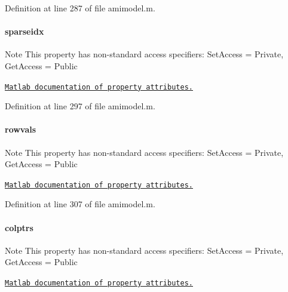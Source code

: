 Definition at line 287 of file amimodel.\+m.

\hypertarget{classamimodel_a6ffb112eda9ff756e17104210981b30b}{}
\paragraph[{sparseidx}]{\setlength{\rightskip}{0pt plus 5cm}sparseidx}\label{classamimodel_a6ffb112eda9ff756e17104210981b30b}
\begin{DoxyNote}{Note}
This property has non-\/standard access specifiers\+: {\ttfamily Set\+Access = Private, Get\+Access = Public} 

\href{http://www.mathworks.com/help/matlab/matlab_oop/property-attributes.html}{\tt Matlab documentation of property attributes.} 
\end{DoxyNote}


Definition at line 297 of file amimodel.\+m.

\hypertarget{classamimodel_aa0abea3560da3f409a28567f42d52872}{}
\paragraph[{rowvals}]{\setlength{\rightskip}{0pt plus 5cm}rowvals}\label{classamimodel_aa0abea3560da3f409a28567f42d52872}
\begin{DoxyNote}{Note}
This property has non-\/standard access specifiers\+: {\ttfamily Set\+Access = Private, Get\+Access = Public} 

\href{http://www.mathworks.com/help/matlab/matlab_oop/property-attributes.html}{\tt Matlab documentation of property attributes.} 
\end{DoxyNote}


Definition at line 307 of file amimodel.\+m.

\hypertarget{classamimodel_a887e8a11654afa197d040d8bb10cbb38}{}
\paragraph[{colptrs}]{\setlength{\rightskip}{0pt plus 5cm}colptrs}\label{classamimodel_a887e8a11654afa197d040d8bb10cbb38}
\begin{DoxyNote}{Note}
This property has non-\/standard access specifiers\+: {\ttfamily Set\+Access = Private, Get\+Access = Public} 

\href{http://www.mathworks.com/help/matlab/matlab_oop/property-attributes.html}{\tt Matlab documentation of property attributes.} 
\end{DoxyNote}


